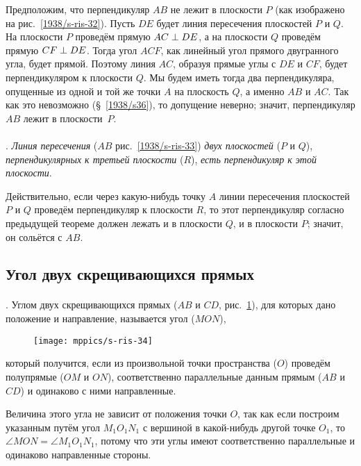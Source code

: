 Предположим, что перпендикуляр $AB$ не лежит в плоскости $P$ (как изображено на рис.~\ref{1938/s-ris-32}).
Пусть $DE$ будет линия пересечения плоскостей $P$ и $Q$.
На плоскости $P$ проведём прямую $AC \z\perp DE$, а на плоскости $Q$ проведём прямую $CF \z\perp DE$.
Тогда угол $ACF$, как линейный угол прямого двугранного угла, будет прямой.
Поэтому линия $AC$, образуя прямые углы с $DE$ и $CF$, будет перпендикуляром к плоскости $Q$.
Мы будем иметь тогда два перпендикуляра, опущенные из одной и той же точки $A$ на плоскость $Q$, а именно $AB$ и $AC$.
Так как это невозможно (§~\ref{1938/s36}), то допущение неверно;
значит, перпендикуляр $AB$ лежит в плоскости~$P$.


\paragraph{}\label{1938/s45}
\mbox{.}
\emph{Линия пересечения} ($AB$ рис.~\ref{1938/s-ris-33}) \emph{двух плоскостей} ($P$ и $Q$), \emph{перпендикулярных к третьей плоскости} ($R$), \emph{есть перпендикуляр к этой плоскости}.

Действительно, если через какую-нибудь точку $A$ линии пересечения плоскостей $P$ и $Q$ проведём перпендикуляр к плоскости $R$, то этот перпендикуляр согласно предыдущей теореме должен лежать и в плоскости $Q$, и в плоскости $P$; значит, он сольётся с $AB$.



\subsection*{Угол двух скрещивающихся прямых}

\paragraph{}\label{1938/s46}
\mbox{.}
Углом двух скрещивающихся прямых ($AB$ и $CD$, рис.~\ref{1938/s-ris-34}), для которых дано положение и направление, называется угол ($MON$), 
\begin{figure}[!ht]
\vskip-0mm
\centering
\texttt{[image: mppics/s-ris-34]}
\caption{}\label{1938/s-ris-34}
\end{figure}
который получится, если из произвольной точки пространства ($O$) проведём полупрямые ($OM$ и $ON$), соответственно параллельные данным прямым ($AB$ и $CD$) и одинаково с ними направленные.


Величина этого угла не зависит от положения точки $O$, так как если построим указанным путём угол $M_1O_1N_1$ с вершиной в какой-нибудь другой точке $O_1$, то $\angle MON = \angle M_1O_1N_1$, потому что эти углы имеют соответственно параллельные и одинаково направленные стороны.

